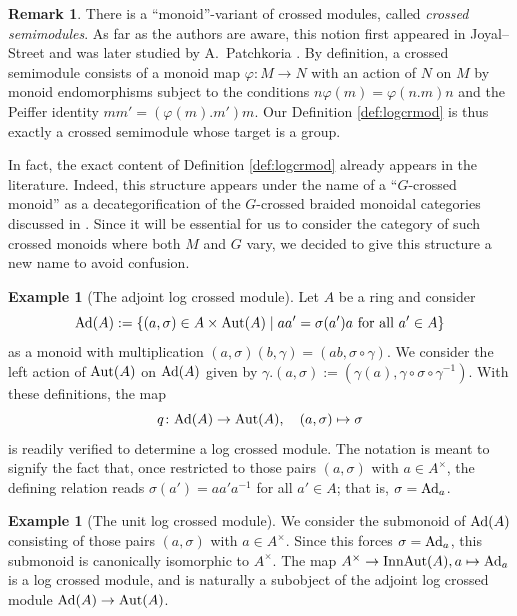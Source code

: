 \documentclass[a4paper,10pt%
]{amsart}
\numberwithin{equation}{section}
\theoremstyle{definition}
\newtheorem{remark}[subsection]{Remark}
\newtheorem{example}[subsection]{Example}
\renewcommand{\:}{\colon}
\begin{document}
\begin{remark}\label{rem:logcross} There is a ``monoid''-variant of crossed modules, called \emph{crossed semimodules}. As far as the authors are aware, this notion first appeared in Joyal--Street \cite[Section 2, Example 4]{JS86} and was later studied by A.\ Patchkoria \cite{Pat98}. By definition, a crossed semimodule consists of a monoid map $\varphi \colon M \to N$ with an action of $N$ on $M$ by monoid endomorphisms subject to the conditions $n\varphi(m) = \varphi(n.m)n$ and the Peiffer identity $mm' = (\varphi(m).m')m$. Our Definition \ref{def:logcrmod} is thus exactly a crossed semimodule whose target is a group.

In fact, the exact content of Definition \ref{def:logcrmod} already appears in the literature. Indeed, this structure appears under the name of a ``$G$-crossed monoid'' as a decategorification of the $G$-crossed braided monoidal categories discussed in \cite[Example 1.6]{JPR22}. Since it will be essential for us to consider the category of such crossed monoids where both $M$ and $G$ vary, we decided to give this structure a new name to avoid confusion. 
\end{remark}

\begin{example}[The adjoint log crossed module]\label{ex:ada} Let $A$ be a ring and consider \[{\rm Ad}(A) := \{(a, \sigma) \in A \times {\rm Aut}(A) \mid aa' = \sigma(a')a \text{ for all }  a' \in A\}\] as a monoid with multiplication $(a, \sigma)(b, \gamma) = (ab, \sigma \circ \gamma)$. We consider the left action of ${\rm Aut}(A)$ on ${\rm Ad}(A)$ given by $\gamma.(a, \sigma) := (\gamma(a), \gamma \circ \sigma \circ \gamma^{-1})$. With these definitions, the map \[q \colon {\rm Ad}(A) \to {\rm Aut}(A), \quad (a, \sigma) \mapsto \sigma\] is readily verified to determine a log crossed module. The notation is meant to signify the fact that, once restricted to those pairs $(a, \sigma)$ with $a \in A^\times$, the defining relation reads $\sigma(a') = aa'a^{-1}$ for all $a' \in A$; that is, $\sigma = {\rm Ad}_a$.
\end{example}

\begin{example}[The unit log crossed module] We consider the submonoid of ${\rm Ad}(A)$ consisting of those pairs $(a, \sigma)$ with $a \in A^\times$. Since this forces $\sigma = {\rm Ad}_a$, this submonoid is canonically isomorphic to $A^\times$. The map $A^\times \to {\rm InnAut}(A), a \mapsto {\rm Ad}_a$ is a log crossed module, and is naturally a subobject of the adjoint log crossed module ${\rm Ad}(A) \to {\rm Aut}(A)$. 
\end{example}
\end{document}
